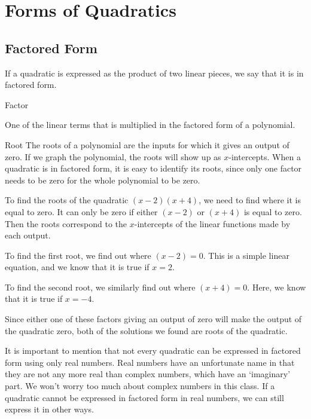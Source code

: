 \section*{Forms of Quadratics}

\subsection*{Factored Form}

If a quadratic is expressed as the product of two linear pieces, we say that it is in factored form.

\begin{defn} Factor

One of the linear terms that is multiplied in the factored form of a polynomial.
\end{defn}


\begin{presentation}
\begin{defn} Root
The roots of a polynomial are the inputs for which it gives an output of zero.  If we graph the polynomial, the roots will show up as $x$-intercepts.  When a quadratic is in factored form, it is easy to identify its roots, since only one factor needs to be zero for the whole polynomial to be zero.
\end{defn}
\end{presentation}

\begin{presentation}
\begin{example}
To find the roots of the quadratic $(x-2)(x+4)$, we need to find where it is equal to zero.  It can only be zero if either $(x-2)$ or $(x+4)$ is equal to zero.  Then the roots correspond to the $x$-intercepts of the linear functions made by each output.

To find the first root, we find out where $(x-2) = 0$.  This is a simple linear equation, and we know that it is true if $x = 2$.

To find the second root, we similarly find out where $(x+4) = 0$.  Here, we know that it is true if $x = -4$.

Since either one of these factors giving an output of zero will make the output of the quadratic zero, both of the solutions we found are roots of the quadratic.

\end{example}
\end{presentation}

It is important to mention that not every quadratic can be expressed in factored form using only real numbers.  Real numbers have an unfortunate name in that they are not any more real than complex numbers, which have an `imaginary' part.  We won't worry too much about complex numbers in this class.  If a quadratic cannot be expressed in factored form in real numbers, we can still express it in other ways.

